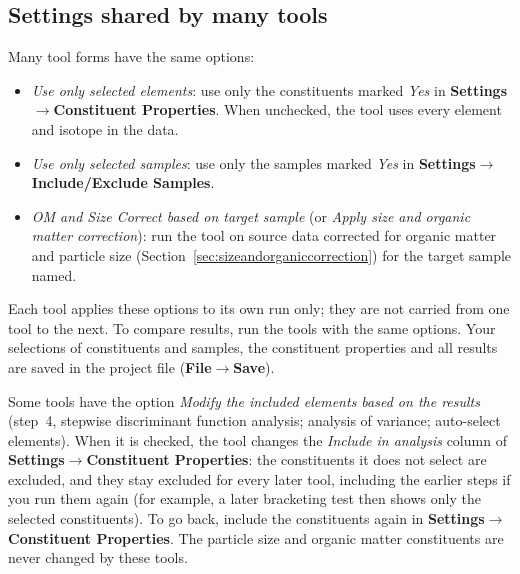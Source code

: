 \documentclass[12pt]{report}
\begin{document}
\subsection{Settings shared by many tools}\label{sec:shared-settings}
Many tool forms have the same options:
\begin{itemize}
    \item \textit{Use only selected elements}: use only the constituents marked \textit{Yes} in \textbf{Settings}$\rightarrow$\textbf{Constituent Properties}. When unchecked, the tool uses every element and isotope in the data.
    \item \textit{Use only selected samples}: use only the samples marked \textit{Yes} in \textbf{Settings}$\rightarrow$\textbf{Include/Exclude Samples}.
    \item \textit{OM and Size Correct based on target sample} (or \textit{Apply size and organic matter correction}): run the tool on source data corrected for organic matter and particle size (Section~\ref{sec:sizeandorganiccorrection}) for the target sample named.
\end{itemize}
Each tool applies these options to its own run only; they are not carried from one tool to the next. To compare results, run the tools with the same options. Your selections of constituents and samples, the constituent properties and all results are saved in the project file (\textbf{File}$\rightarrow$\textbf{Save}).

\begin{tcolorbox}[colback=yellow!10,colframe=yellow!50!black,title=Note]
Some tools have the option \textit{Modify the included elements based on the results} (step~4, stepwise discriminant function analysis; analysis of variance; auto-select elements). When it is checked, the tool changes the \textit{Include in analysis} column of \textbf{Settings}$\rightarrow$\textbf{Constituent Properties}: the constituents it does not select are excluded, and they stay excluded for every later tool, including the earlier steps if you run them again (for example, a later bracketing test then shows only the selected constituents). To go back, include the constituents again in \textbf{Settings}$\rightarrow$\textbf{Constituent Properties}. The particle size and organic matter constituents are never changed by these tools.
\end{tcolorbox}
\end{document}
